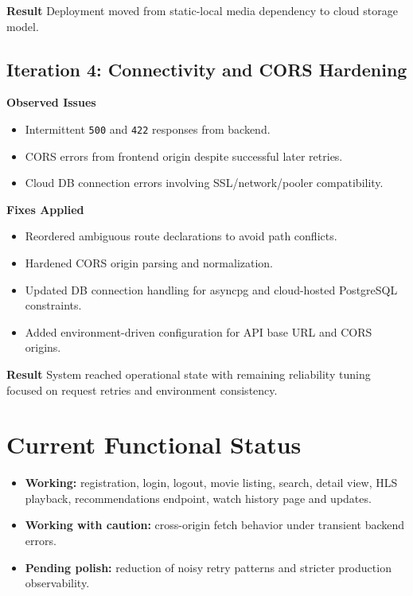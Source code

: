 \documentclass[conference]{IEEEtran}
\begin{document}
\textbf{Result}
Deployment moved from static-local media dependency to cloud storage model.

\subsection{Iteration 4: Connectivity and CORS Hardening}
\textbf{Observed Issues}
\begin{itemize}
\item Intermittent \texttt{500} and \texttt{422} responses from backend.
\item CORS errors from frontend origin despite successful later retries.
\item Cloud DB connection errors involving SSL/network/pooler compatibility.
\end{itemize}

\textbf{Fixes Applied}
\begin{itemize}
\item Reordered ambiguous route declarations to avoid path conflicts.
\item Hardened CORS origin parsing and normalization.
\item Updated DB connection handling for asyncpg and cloud-hosted PostgreSQL constraints.
\item Added environment-driven configuration for API base URL and CORS origins.
\end{itemize}

\textbf{Result}
System reached operational state with remaining reliability tuning focused on request retries and environment consistency.

\section{Current Functional Status}
\begin{itemize}
\item \textbf{Working:} registration, login, logout, movie listing, search, detail view, HLS playback, recommendations endpoint, watch history page and updates.
\item \textbf{Working with caution:} cross-origin fetch behavior under transient backend errors.
\item \textbf{Pending polish:} reduction of noisy retry patterns and stricter production observability.
\end{itemize}
\end{document}
